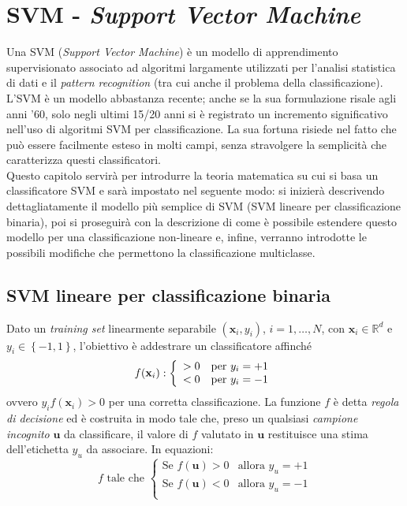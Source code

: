 \chapter{SVM - \emph{Support Vector Machine}} %

\label{cap:svm} %

Una SVM (\emph{Support Vector Machine}) è un modello di apprendimento supervisionato associato ad algoritmi largamente utilizzati per l'analisi statistica di dati e il \emph{pattern recognition} (tra cui anche il problema della classificazione).
L'SVM è un modello abbastanza recente; anche se la sua formulazione risale agli anni '60, solo negli ultimi 15/20 anni si è registrato un incremento significativo nell'uso di algoritmi SVM per classificazione.
La sua fortuna risiede nel fatto che può essere facilmente esteso in molti campi, senza stravolgere la semplicità che caratterizza questi classificatori.
\\
Questo capitolo servirà per introdurre la teoria matematica su cui si basa un classificatore SVM e sarà impostato nel seguente modo: si inizierà descrivendo dettagliatamente il modello più semplice di SVM (SVM lineare per classificazione binaria), poi si proseguirà con la descrizione di come è possibile estendere questo modello per una classificazione non-lineare e, infine, verranno introdotte le possibili modifiche che permettono la classificazione multiclasse.
\clearpage

\section{SVM lineare per classificazione binaria}
Dato un \emph{training set} linearmente separabile $(\mathbf{x}_i,y_i)$, $i=1,\ldots,N$, con $\mathbf{x}_i\in\mathbb{R}^d$ e $y_i\in\left\lbrace -1,1\right\rbrace$, l'obiettivo è addestrare un classificatore affinché
\begin{equation}
\label{eq:SVM_lin_bin}
f(\mathbf{x}_i):\left\{ \begin{array}{ll} >0 & \mbox{per } y_i=+1 \\ < 0 & \mbox{per } y_i=-1 \end{array} \right.
\end{equation}
ovvero $y_if(\mathbf{x}_i)>0$ per una corretta classificazione.
La funzione $f$ è detta \textit{regola di decisione} ed è costruita in modo tale che, preso un qualsiasi \textit{campione incognito} $\mathbf{u}$ da classificare, il valore di $f$ valutato in $\mathbf{u}$ restituisce una stima dell'etichetta $y_u$ da associare. In equazioni:
\begin{equation}
\label{eq:regola_di_decisione}
f\text{ tale che }
\left\{
		\begin{array}{ll}
			\text{Se } f(\mathbf{u})>0 & \mbox{allora } y_u=+1 \\
			\text{Se } f(\mathbf{u})<0 & \mbox{allora } y_u=-1 \\
		\end{array}
	\right.
\end{equation}
